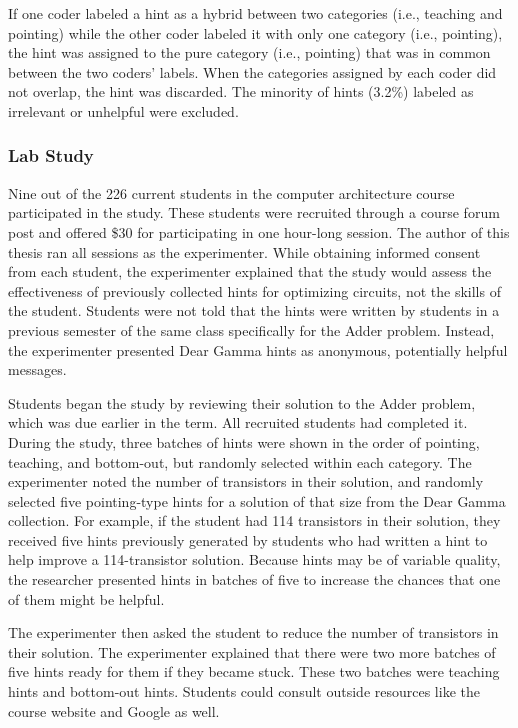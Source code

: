 If one coder labeled a hint as a hybrid between two categories (i.e., teaching and pointing) while the other coder labeled it with only one category (i.e., pointing), the hint was assigned to the pure category (i.e., pointing) that was in common between the two coders' labels. When the categories assigned by each coder did not overlap, the hint was discarded. The minority of hints (3.2\%) labeled as irrelevant or unhelpful were excluded.

\subsubsection{Lab Study}

Nine out of the 226 current students in the computer architecture course participated in the study. These students were recruited through a course forum post and offered \$30 for participating in one hour-long session. The author of this thesis ran all sessions as the experimenter. While obtaining informed consent from each student, the experimenter explained that the study would assess the effectiveness of previously collected hints for optimizing circuits, not the skills of the student. Students were not told that the hints were written by students in a previous semester of the same class specifically for the Adder problem. Instead, the experimenter presented Dear Gamma hints as anonymous, potentially helpful messages. 

Students began the study by reviewing their solution to the Adder problem, which was due earlier in the term. All recruited students had completed it. During the study, three batches of hints were shown in the order of pointing, teaching, and bottom-out, but randomly selected within each category. The experimenter noted the number of transistors in their solution, and randomly selected five pointing-type hints for a solution of that size from the Dear Gamma collection. For example, if the student had 114 transistors in their solution, they received five hints previously generated by students who had written a hint to help improve a 114-transistor solution. Because hints may be of variable quality, the researcher presented hints in batches of five to increase the chances that one of them might be helpful.

The experimenter then asked the student to reduce the number of transistors in their solution. The experimenter explained that there were two more batches of five hints ready for them if they became stuck. These two batches were teaching hints and bottom-out hints. Students could consult outside resources like the course website and Google as well. 

